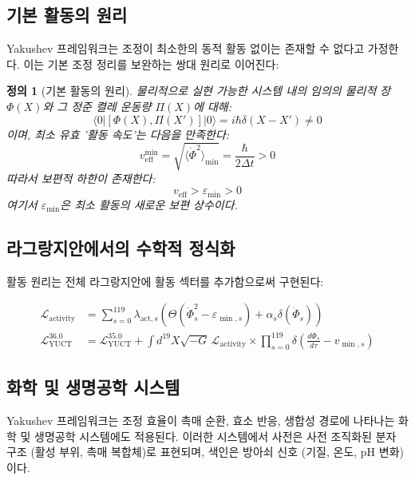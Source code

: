 \documentclass[11pt,a4paper]{article}
\newtheorem{definition}{정의}
\begin{document}
\subsection{기본 활동의 원리}

Yakushev 프레임워크는 조정이 최소한의 동적 활동 없이는 존재할 수 없다고 가정한다. 이는 기본 조정 정리를 보완하는 쌍대 원리로 이어진다:

\begin{definition}[기본 활동의 원리]
물리적으로 실현 가능한 시스템 내의 임의의 물리적 장 $\Phi(X)$와 그 정준 켤레 운동량 $\Pi(X)$에 대해:
\[
\langle 0 | [\Phi(X), \Pi(X')] | 0 \rangle = i\hbar\delta(X-X') \neq 0
\]
이며, 최소 유효 '활동 속도'는 다음을 만족한다:
\[
v_{\mathrm{eff}}^{\min} = \sqrt{\langle \dot{\Phi}^2 \rangle_{\min}} = \frac{\hbar}{2\Delta t} > 0
\]
따라서 보편적 하한이 존재한다:
\[
\boxed{v_{\mathrm{eff}} > \varepsilon_{\min} > 0}
\]
여기서 $\varepsilon_{\min}$은 최소 활동의 새로운 보편 상수이다.
\end{definition}

\subsection{라그랑지안에서의 수학적 정식화}

활동 원리는 전체 라그랑지안에 활동 섹터를 추가함으로써 구현된다:

\begin{align}
\mathcal{L}_{\mathrm{activity}} &= \sum_{s=0}^{119} \lambda_{\mathrm{act},s} \left( \Theta(\dot{\Phi}_s^2 - \varepsilon_{\min,s}) + \alpha_s \delta(\dot{\Phi}_s) \right) \\
\mathcal{L}_{\mathrm{YUCT}}^{36.0} &= \mathcal{L}_{\mathrm{YUCT}}^{35.0} + \int d^{19}X \sqrt{-G} \, \mathcal{L}_{\mathrm{activity}} \times \prod_{s=0}^{119} \delta\left( \frac{d\Phi_s}{d\tau} - v_{\min,s} \right)
\end{align}

\subsection{화학 및 생명공학 시스템}
\label{subsec:chemical-systems}

Yakushev 프레임워크는 조정 효율이 촉매 순환, 효소 반응, 생합성 경로에 나타나는 화학 및 생명공학 시스템에도 적용된다. 이러한 시스템에서 사전은 사전 조직화된 분자 구조 (활성 부위, 촉매 복합체)로 표현되며, 색인은 방아쇠 신호 (기질, 온도, pH 변화)이다.
\end{document}
